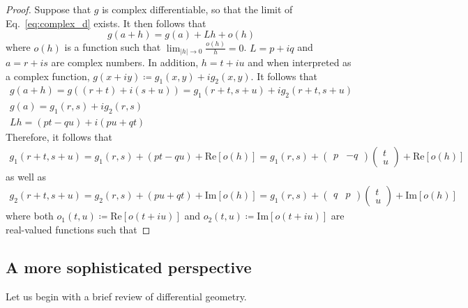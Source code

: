 \documentclass[aps,pra,showpacs,notitlepage,onecolumn,superscriptaddress,nofootinbib]{revtex4-1}
\theoremstyle{definition}
\begin{document}
\begin{proof}
  Suppose that $g$ is complex differentiable, so that the limit of Eq.~\eqref{eq:complex_d} exists. It then follows that
  \begin{equation}
    g(a + h) = g(a) + L h + o(h)
  \end{equation}
  where $o(h)$ is a function such that $\lim_{|h| \to 0} \frac{o(h)}{h} = 0$. $L = p + i q$ and $a = r + is$ are complex numbers. In addition, $h = t + iu$ and when interpreted as a complex function,
  $g(x + iy) \coloneqq g_1(x, y) + i g_2(x, y)$. It follows that
  \begin{align}
    g(a + h) = g\left( (r + t) + i(s + u) \right) = g_1(r + t, s + u) + i g_2(r + t, s + u) \\
    g(a) = g_1(r, s) + i g_2(r, s) \\
    L h = (p t - q u) + i (pu + q t)
  \end{align}
  Therefore, it follows that
  \begin{align}
    g_1(r + t, s + u) = g_1(r, s) + (pt - qu) + \text{Re}[o(h)] = g_1(r, s) + \begin{pmatrix} p & -q \end{pmatrix} \begin{pmatrix} t \\ u \end{pmatrix} + \text{Re}[o(h)]
  \end{align}
  as well as
  \begin{align}
    g_2(r + t, s + u) = g_2(r, s) + (pu + qt) + \text{Im}[o(h)] = g_1(r, s) + \begin{pmatrix} q & p \end{pmatrix} \begin{pmatrix} t \\ u \end{pmatrix} + \text{Im}[o(h)]
  \end{align}
  where both $o_1(t, u) \coloneqq \text{Re}[o(t + iu)]$ and $o_2(t, u) \coloneqq \text{Im}[o(t + iu)]$ are real-valued functions such that 
\end{proof}

\subsection{A more sophisticated perspective}

\noindent Let us begin with a brief review of differential geometry.
\end{document}
